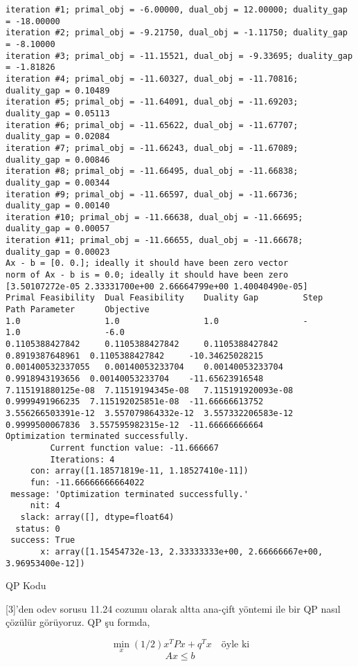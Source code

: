\documentclass[12pt,fleqn]{article}\usepackage{../../common}
\begin{document}
\begin{verbatim}
iteration #1; primal_obj = -6.00000, dual_obj = 12.00000; duality_gap = -18.00000
iteration #2; primal_obj = -9.21750, dual_obj = -1.11750; duality_gap = -8.10000
iteration #3; primal_obj = -11.15521, dual_obj = -9.33695; duality_gap = -1.81826
iteration #4; primal_obj = -11.60327, dual_obj = -11.70816; duality_gap = 0.10489
iteration #5; primal_obj = -11.64091, dual_obj = -11.69203; duality_gap = 0.05113
iteration #6; primal_obj = -11.65622, dual_obj = -11.67707; duality_gap = 0.02084
iteration #7; primal_obj = -11.66243, dual_obj = -11.67089; duality_gap = 0.00846
iteration #8; primal_obj = -11.66495, dual_obj = -11.66838; duality_gap = 0.00344
iteration #9; primal_obj = -11.66597, dual_obj = -11.66736; duality_gap = 0.00140
iteration #10; primal_obj = -11.66638, dual_obj = -11.66695; duality_gap = 0.00057
iteration #11; primal_obj = -11.66655, dual_obj = -11.66678; duality_gap = 0.00023
Ax - b = [0. 0.]; ideally it should have been zero vector
norm of Ax - b is = 0.0; ideally it should have been zero
[3.50107272e-05 2.33331700e+00 2.66664799e+00 1.40040490e-05]
Primal Feasibility  Dual Feasibility    Duality Gap         Step             Path Parameter      Objective          
1.0                 1.0                 1.0                 -                1.0                 -6.0                
0.1105388427842     0.1105388427842     0.1105388427842     0.8919387648961  0.1105388427842     -10.34625028215     
0.001400532337055   0.00140053233704    0.00140053233704    0.9918943193656  0.00140053233704    -11.65623916548     
7.115191880125e-08  7.11519194345e-08   7.115191920093e-08  0.9999491966235  7.115192025851e-08  -11.66666613752     
3.556266503391e-12  3.557079864332e-12  3.557332206583e-12  0.9999500067836  3.557595982315e-12  -11.66666666664     
Optimization terminated successfully.
         Current function value: -11.666667  
         Iterations: 4
     con: array([1.18571819e-11, 1.18527410e-11])
     fun: -11.66666666664022
 message: 'Optimization terminated successfully.'
     nit: 4
   slack: array([], dtype=float64)
  status: 0
 success: True
       x: array([1.15454732e-13, 2.33333333e+00, 2.66666667e+00, 3.96953400e-12])
\end{verbatim}

QP Kodu

[3]'den odev sorusu 11.24 cozumu olarak altta ana-çift yöntemi ile bir QP
nasıl çözülür görüyoruz. QP şu formda,

$$
\min_x (1/2) x^T P x + q^T x \quad \textrm{öyle ki}
$$
$$
Ax \le b
$$
\end{document}
